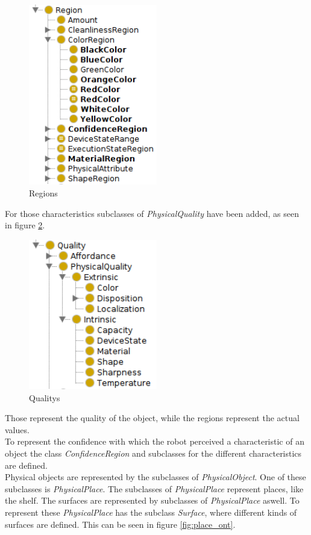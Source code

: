 \documentclass[main.tex]{subfiles}
\begin{document}
\begin{figure}
\centering
\includegraphics[width=0.5\textwidth]{pictures/ontology/Ontologie_region}
\caption{Regions}
\label{fig:region_ont}
\end{figure}

For those characteristics subclasses of \textit{PhysicalQuality} have been added, as seen in figure \ref{fig:quality_ont}.

\begin{figure}
\centering
\includegraphics[width=0.5\textwidth]{pictures/ontology/Ontologie_quality}
\caption{Qualitys}
\label{fig:quality_ont}
\end{figure}

 Those represent the quality of the object, while the regions represent the actual values.\\
To represent the confidence with which the robot perceived a characteristic of an object the class \textit{ConfidenceRegion} and subclasses for the different characteristics are defined.\\
Physical objects are represented by the subclasses of \textit{PhysicalObject}.
One of these subclasses is \textit{PhysicalPlace}. The subclasses of \textit{PhysicalPlace} represent places, like the shelf. The surfaces are represented by subclasses of \textit{PhysicalPlace} aswell. To represent these \textit{PhysicalPlace} has the subclass \textit{Surface}, where different kinds of surfaces are defined. This can be seen in figure \ref{fig:place_ont}.
\end{document}
